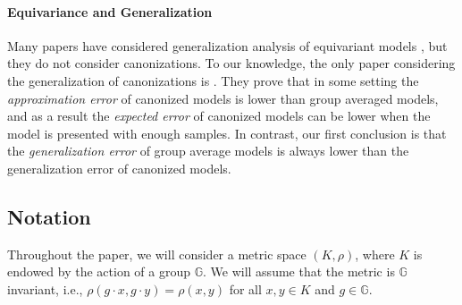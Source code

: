 \documentclass{article}
\theoremstyle{definition}
\theoremstyle{plain}
\newcommand{\G}{\mathbb{G}}
\begin{document}
\paragraph{Equivariance and Generalization} Many papers have considered generalization analysis of equivariant models \cite{vasileiou2025survey,petrache2023approximationgeneralization,maskey2025generalization, franks2024weisfeiler}, but they do not consider canonizations. To our knowledge, the only paper considering the generalization of canonizations is \cite{tahmasebi2025generalization}. They prove that in some setting the \emph{approximation error}  of canonized models is lower than group averaged models, and as a result the \emph{expected error} of canonized models can be lower when the model is presented with enough samples. In contrast, our first conclusion is that the \emph{generalization error} of group average models is always lower than the generalization error of canonized models.


\subsection{Notation}
Throughout the paper, we will consider a metric space $(K,\rho) $, where $K$ is endowed by the action of a group $\G$. We will assume that the metric is $\G$ invariant, i.e., $ \rho(g\cdot x, g \cdot y)=\rho(x,y)$ for all $x,y\in K$ and $g \in \G $.  
\end{document}
